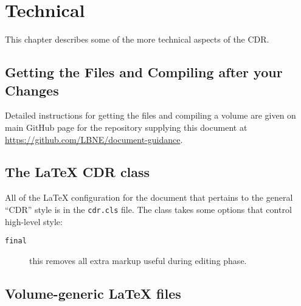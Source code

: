 \chapter{Technical}

This chapter describes some of the more technical aspects of the CDR.

\section{Getting the Files and Compiling after your Changes}
\label{sec:getfiles-compile}

Detailed instructions for getting the files and compiling a volume are
given on main GitHub page for the repository supplying this document at
\url{https://github.com/LBNE/document-guidance}.


\section{The \LaTeX{} CDR class}

All of the \LaTeX{} configuration for the document that pertains to
the general ``CDR'' style is in the
\texttt{cdr.cls} file.
The class takes some options that control high-level style:

\begin{description}
\item[\texttt{final}] this removes all extra markup useful during
  editing phase.
\end{description}

\section{Volume-generic \LaTeX{} files}

